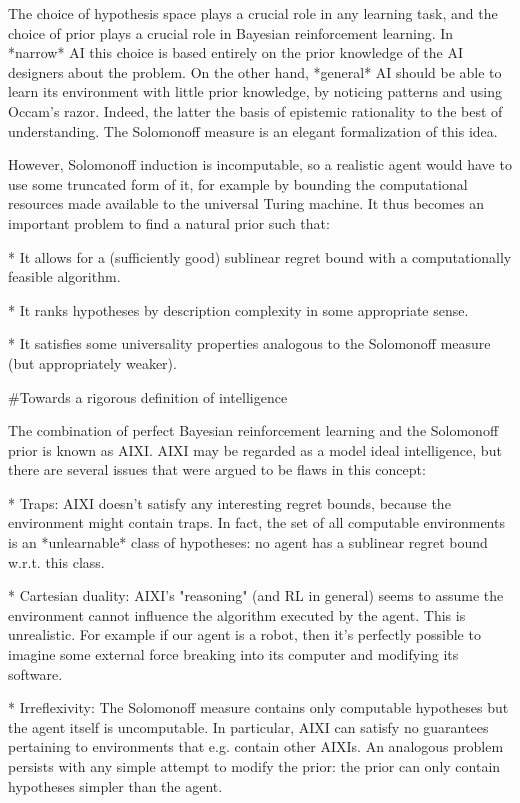 \documentclass[a4paper]{article}
\begin{document}
The choice of hypothesis space plays a crucial role in any learning task, and the choice of prior plays a crucial role in Bayesian reinforcement learning. In *narrow* AI this choice is based entirely on the prior knowledge of the AI designers about the problem. On the other hand, *general* AI should be able to learn its environment with little prior knowledge, by noticing patterns and using Occam's razor. Indeed, the latter the basis of epistemic rationality to the best of understanding. The Solomonoff measure is an elegant formalization of this idea.

However, Solomonoff induction is incomputable, so a realistic agent would have to use some truncated form of it, for example by bounding the computational resources made available to the universal Turing machine. It thus becomes an important problem to find a natural prior such that:

* It allows for a (sufficiently good) sublinear regret bound with a computationally feasible algorithm.

* It ranks hypotheses by description complexity in some appropriate sense.

* It satisfies some universality properties analogous to the Solomonoff measure (but appropriately weaker).

\#Towards a rigorous definition of intelligence

The combination of perfect Bayesian reinforcement learning and the Solomonoff prior is known as AIXI. AIXI may be regarded as a model ideal intelligence, but there are several issues that were argued to be flaws in this concept:

* Traps: AIXI doesn't satisfy any interesting regret bounds, because the environment might contain traps. In fact, the set of all computable environments is an *unlearnable* class of hypotheses: no agent has a sublinear regret bound w.r.t. this class.

* Cartesian duality: AIXI's "reasoning" (and RL in general) seems to assume the environment cannot influence the algorithm executed by the agent. This is unrealistic. For example if our agent is a robot, then it's perfectly possible to imagine some external force breaking into its computer and modifying its software.

* Irreflexivity: The Solomonoff measure contains only computable hypotheses but the agent itself is uncomputable. In particular, AIXI can satisfy no guarantees pertaining to environments that e.g. contain other AIXIs. An analogous problem persists with any simple attempt to modify the prior: the prior can only contain hypotheses simpler than the agent.
\end{document}
